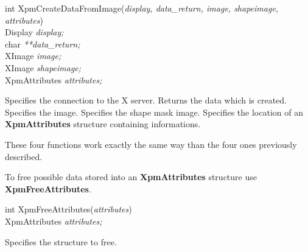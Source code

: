\begin{flushleft}

int XpmCreateDataFromImage({\it display, data\_return, image, shapeimage,\\
\hspace{3cm}attributes})\\

\hspace{1cm}Display {\it *display;}\\
\hspace{1cm}char {\it ***data\_return;}\\
\hspace{1cm}XImage {\it *image;}\\
\hspace{1cm}XImage {\it *shapeimage;}\\
\hspace{1cm}XpmAttributes {\it *attributes;}

\end{flushleft}

\begin{description}

 Specifies the connection to the X server.
 Returns the data which is created.
 Specifies the image.
 Specifies the shape mask image.
 Specifies the location of an {\bf XpmAttributes} structure
containing informations.

\end{description} 

These four functions work exactly the same way than the four ones previously
described.

\vspace{.5cm}
To free possible data stored into an {\bf XpmAttributes} structure use {\bf
XpmFreeAttributes}.

\begin{flushleft} 

int XpmFreeAttributes({\it attributes})\\

\hspace{1cm}XpmAttributes {\it *attributes;}

\end{flushleft}

\begin{description}

 Specifies the structure to free.

\end{description}


